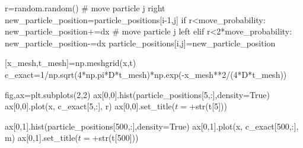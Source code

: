 \documentclass[
  letterpaper,
  DIV=11,
  numbers=noendperiod]{scrreprt}
\newenvironment{Shaded}{\begin{snugshade}}{\end{snugshade}}
\newcommand{\BuiltInTok}[1]{\textcolor[rgb]{0.00,0.23,0.31}{#1}}
\newcommand{\CommentTok}[1]{\textcolor[rgb]{0.37,0.37,0.37}{#1}}
\newcommand{\ControlFlowTok}[1]{\textcolor[rgb]{0.00,0.23,0.31}{#1}}
\newcommand{\DecValTok}[1]{\textcolor[rgb]{0.68,0.00,0.00}{#1}}
\newcommand{\NormalTok}[1]{\textcolor[rgb]{0.00,0.23,0.31}{#1}}
\newcommand{\OperatorTok}[1]{\textcolor[rgb]{0.37,0.37,0.37}{#1}}
\newcommand{\StringTok}[1]{\textcolor[rgb]{0.13,0.47,0.30}{#1}}
\newcommand{\VariableTok}[1]{\textcolor[rgb]{0.07,0.07,0.07}{#1}}
\theoremstyle{plain}
\theoremstyle{definition}
\theoremstyle{plain}
\theoremstyle{remark}
\begin{document}
\begin{Shaded}
\begin{Highlighting}[]
\NormalTok{    r}\OperatorTok{=}\NormalTok{random.random()}
    \CommentTok{\# move particle j right}
\NormalTok{    new\_particle\_position}\OperatorTok{=}\NormalTok{particle\_positions[i}\OperatorTok{{-}}\DecValTok{1}\NormalTok{,j]}
    \ControlFlowTok{if}\NormalTok{ r}\OperatorTok{\textless{}}\NormalTok{move\_probability:}
\NormalTok{      new\_particle\_position}\OperatorTok{+=}\NormalTok{dx}
    \CommentTok{\# move particle j left  }
    \ControlFlowTok{elif}\NormalTok{ r}\OperatorTok{\textless{}}\DecValTok{2}\OperatorTok{*}\NormalTok{move\_probability:}
\NormalTok{      new\_particle\_position}\OperatorTok{{-}=}\NormalTok{dx}
\NormalTok{    particle\_positions[i,j]}\OperatorTok{=}\NormalTok{new\_particle\_position}


\NormalTok{[x\_mesh,t\_mesh]}\OperatorTok{=}\NormalTok{np.meshgrid(x,t)}
\NormalTok{c\_exact}\OperatorTok{=}\DecValTok{1}\OperatorTok{/}\NormalTok{np.sqrt(}\DecValTok{4}\OperatorTok{*}\NormalTok{np.pi}\OperatorTok{*}\NormalTok{D}\OperatorTok{*}\NormalTok{t\_mesh)}\OperatorTok{*}\NormalTok{np.exp(}\OperatorTok{{-}}\NormalTok{x\_mesh}\OperatorTok{**}\DecValTok{2}\OperatorTok{/}\NormalTok{(}\DecValTok{4}\OperatorTok{*}\NormalTok{D}\OperatorTok{*}\NormalTok{t\_mesh))}


\NormalTok{fig,ax}\OperatorTok{=}\NormalTok{plt.subplots(}\DecValTok{2}\NormalTok{,}\DecValTok{2}\NormalTok{)}
\NormalTok{ax[}\DecValTok{0}\NormalTok{,}\DecValTok{0}\NormalTok{].hist(particle\_positions[}\DecValTok{5}\NormalTok{,:],density}\OperatorTok{=}\VariableTok{True}\NormalTok{)}
\NormalTok{ax[}\DecValTok{0}\NormalTok{,}\DecValTok{0}\NormalTok{].plot(x, c\_exact[}\DecValTok{5}\NormalTok{,:], }\StringTok{\textquotesingle{}r\textquotesingle{}}\NormalTok{)}
\NormalTok{ax[}\DecValTok{0}\NormalTok{,}\DecValTok{0}\NormalTok{].set\_title(}\StringTok{\textquotesingle{}$t=$\textquotesingle{}}\OperatorTok{+}\BuiltInTok{str}\NormalTok{(t[}\DecValTok{5}\NormalTok{]))}

\NormalTok{ax[}\DecValTok{0}\NormalTok{,}\DecValTok{1}\NormalTok{].hist(particle\_positions[}\DecValTok{500}\NormalTok{,:],density}\OperatorTok{=}\VariableTok{True}\NormalTok{)}
\NormalTok{ax[}\DecValTok{0}\NormalTok{,}\DecValTok{1}\NormalTok{].plot(x, c\_exact[}\DecValTok{500}\NormalTok{,:], }\StringTok{\textquotesingle{}m\textquotesingle{}}\NormalTok{)}
\NormalTok{ax[}\DecValTok{0}\NormalTok{,}\DecValTok{1}\NormalTok{].set\_title(}\StringTok{\textquotesingle{}$t=$\textquotesingle{}}\OperatorTok{+}\BuiltInTok{str}\NormalTok{(t[}\DecValTok{500}\NormalTok{]))}


\end{Highlighting}
\end{Shaded}
\end{document}
